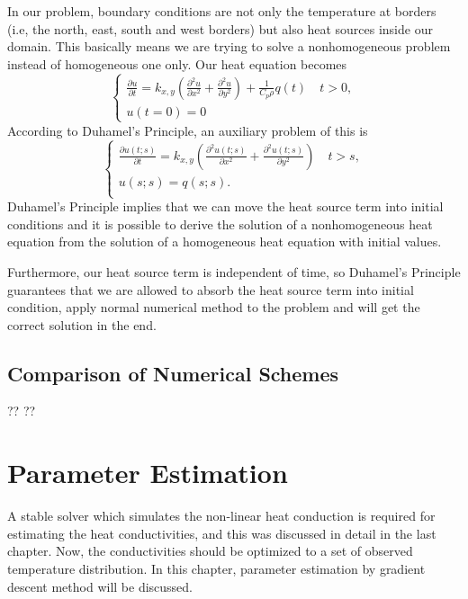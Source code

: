 \documentclass[10pt,a4paper]{report}
\begin{document}

In our problem, boundary conditions are not only the temperature at borders (i.e, the north, east, south and west borders) but also heat sources inside our domain. This basically means we are trying to solve a nonhomogeneous problem instead of homogeneous one only. Our heat equation becomes
\begin{equation}
\begin{cases}
 {\frac{\partial u}{\partial t}}=k_{x,y} ({\frac{\partial^2 u}{\partial x^2}}+{\frac{\partial^2 u}{\partial y^2}})+{\frac{1}{C_p \rho}}q(t) \quad t>0,\\
 u(t=0)=0
\end{cases}
\end{equation}
\[\]  
According to Duhamel's Principle, an auxiliary problem of this is   
\begin{equation}
\begin{cases}
 {\frac{\partial u(t;s)}{\partial t}}=k_{x,y} ({\frac{\partial^2 u(t;s)}{\partial x^2}}+{\frac{\partial^2 u(t;s)}{\partial y^2}}) \quad t>s,\\
 u(s;s)=q(s;s).\\
\end{cases}  
\end{equation}
\[\]
Duhamel's Principle implies that we can move the heat source term into initial conditions and it is possible to derive the solution of a nonhomogeneous heat equation from the solution of a homogeneous heat equation with initial values.

Furthermore, our heat source term is independent of time, so Duhamel's Principle guarantees that we are allowed to absorb the heat source term into initial condition, apply normal numerical method to the problem and will get the correct solution in the end.

\section{Comparison of Numerical Schemes}
??
??




\chapter{Parameter Estimation}
A stable solver which simulates the non-linear heat conduction is required for estimating the heat conductivities, and this was discussed in detail in the last chapter. Now, the conductivities should be optimized to a set of observed temperature distribution. In this chapter, parameter estimation by  gradient descent method will be discussed. 
\end{document}

